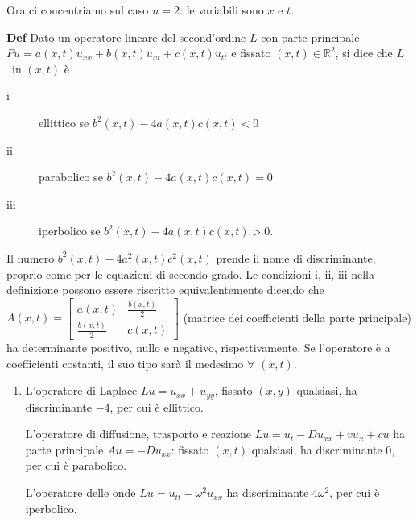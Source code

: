 \documentclass{article}
\begin{document}
Ora ci concentriamo sul caso $n=2$: le variabili sono $x$ e $t$.

\textbf{Def} Dato un operatore lineare del second'ordine $L$ con parte
principale $Pu=a\left( x,t\right) u_{xx}+b\left( x,t\right) u_{xt}+c\left(
x,t\right) u_{tt}$ e fissato $\left( x,t\right) \in 
\mathbb{R}
^{2}$, si dice che $L$\ in $\left( x,t\right) $ \`{e}

\begin{description}
\item[i] ellittico se $b^{2}\left( x,t\right) -4a\left( x,t\right) c\left(
x,t\right) <0$

\item[ii] parabolico se $b^{2}\left( x,t\right) -4a\left( x,t\right) c\left(
x,t\right) =0$

\item[iii] iperbolico se $b^{2}\left( x,t\right) -4a\left( x,t\right)
c\left( x,t\right) >0$.
\end{description}

Il numero $b^{2}\left( x,t\right) -4a^{2}\left( x,t\right) c^{2}\left(
x,t\right) $ prende il nome di discriminante, proprio come per le equazioni
di secondo grado. Le condizioni i, ii, iii nella definizione possono essere
riscritte equivalentemente dicendo che $A\left( x,t\right) =\left[ 
\begin{array}{cc}
a\left( x,t\right) & \frac{b\left( x,t\right) }{2} \\ 
\frac{b\left( x,t\right) }{2} & c\left( x,t\right)%
\end{array}%
\right] $ (matrice dei coefficienti della parte principale) ha determinante
positivo, nullo e negativo, rispettivamente. Se l'operatore \`{e} a
coefficienti costanti, il suo tipo sar\`{a} il medesimo $\forall $ $\left(
x,t\right) $.

\begin{enumerate}
\item L'operatore di Laplace $Lu=u_{xx}+u_{yy}$, fissato $\left( x,y\right) $
qualsiasi, ha discriminante $-4$, per cui \`{e} ellittico.

L'operatore di diffusione, trasporto e reazione $Lu=u_{t}-Du_{xx}+vu_{x}+cu$
ha parte principale $Au=-Du_{xx}$: fissato $\left( x,t\right) $ qualsiasi,
ha discriminante $0$, per cui \`{e} parabolico.

L'operatore delle onde $Lu=u_{tt}-\omega ^{2}u_{xx}$ ha discriminante $%
4\omega ^{2}$, per cui \`{e} iperbolico.
\end{enumerate}
\end{document}
